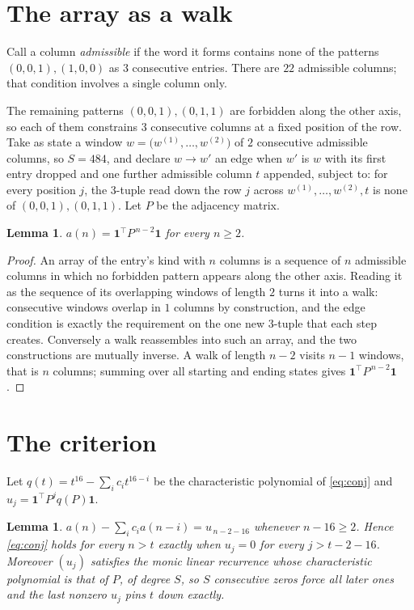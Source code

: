 \documentclass[11pt,a4paper]{article}
\theoremstyle{plain}
\newtheorem{lemma}[theorem]{Lemma}
\theoremstyle{definition}
\begin{document}
\section{The array as a walk}

Call a column \emph{admissible} if the word it forms contains none of the patterns
$(0,0,1), (1,0,0)$ as $3$ consecutive entries. There are $22$ admissible columns; that condition
involves a single column only.

The remaining patterns $(0,0,1), (0,1,1)$ are forbidden along the other axis, so each of them
constrains $3$ consecutive columns at a fixed position of the row. Take as state a
window $w=\bigl(w^{(1)},\dots,w^{(2)}\bigr)$ of $2$ consecutive admissible
columns, so $S=484$, and declare $w\to w'$ an edge when $w'$ is $w$ with its first entry
dropped and one further admissible column $t$ appended, subject to: for every position
$j$, the $3$-tuple read down the row $j$ across $w^{(1)},\dots,w^{(2)},t$
is none of $(0,0,1), (0,1,1)$. Let $P$ be the adjacency matrix.

\begin{lemma}\label{lem:walk}
$a(n)=\mathbf{1}^{\!\top}P^{\,n-2}\mathbf{1}$ for every $n\ge2$.
\end{lemma}

\begin{proof}
An array of the entry's kind with $n$ columns is a sequence of $n$ admissible columns in
which no forbidden pattern appears along the other axis. Reading it as the sequence of its
overlapping windows of length $2$ turns it into a walk: consecutive windows overlap in
$1$ columns by construction, and the edge condition is exactly the requirement on the one
new $3$-tuple that each step creates. Conversely a walk reassembles into such an array,
and the two constructions are mutually inverse. A walk of length $n-2$ visits $n-1$
windows, that is $n$ columns; summing over all starting and ending states gives
$\mathbf{1}^{\!\top}P^{\,n-2}\mathbf{1}$.
\end{proof}

\section{The criterion}

Let $q(t)=t^{16}-\sum_i c_i t^{16-i}$ be the characteristic polynomial of
\eqref{eq:conj} and $u_j=\mathbf{1}^{\!\top}P^{j}q(P)\mathbf{1}$.

\begin{lemma}\label{lem:crit}
$a(n)-\sum_i c_i a(n-i)=u_{\,n-2-16}$ whenever $n-16\ge2$. Hence
\eqref{eq:conj} holds for every $n>t$ exactly when $u_j=0$ for every
$j>t-2-16$. Moreover $(u_j)$ satisfies the monic linear recurrence whose
characteristic polynomial is that of $P$, of degree $S$, so $S$ consecutive zeros force all
later ones and the last nonzero $u_j$ pins $t$ down exactly.
\end{lemma}
\end{document}
